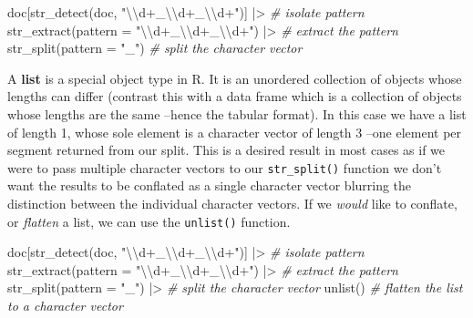 \documentclass[
  letterpaper,
  DIV=11,
  numbers=noendperiod]{scrreport}
\newenvironment{Shaded}{\begin{snugshade}}{\end{snugshade}}
\newcommand{\AttributeTok}[1]{\textcolor[rgb]{0.00,0.00,0.00}{#1}}
\newcommand{\CommentTok}[1]{\textcolor[rgb]{0.00,0.00,0.00}{\textit{#1}}}
\newcommand{\FunctionTok}[1]{\textcolor[rgb]{0.00,0.00,0.00}{#1}}
\newcommand{\NormalTok}[1]{\textcolor[rgb]{0.00,0.00,0.00}{#1}}
\newcommand{\SpecialCharTok}[1]{\textcolor[rgb]{0.00,0.00,0.00}{#1}}
\newcommand{\StringTok}[1]{\textcolor[rgb]{0.00,0.00,0.00}{#1}}
\theoremstyle{definition}
\theoremstyle{remark}
\begin{document}
\begin{Shaded}
\begin{Highlighting}[]
\NormalTok{doc[}\FunctionTok{str\_detect}\NormalTok{(doc, }\StringTok{"}\SpecialCharTok{\textbackslash{}\textbackslash{}}\StringTok{d+\_}\SpecialCharTok{\textbackslash{}\textbackslash{}}\StringTok{d+\_}\SpecialCharTok{\textbackslash{}\textbackslash{}}\StringTok{d+"}\NormalTok{)] }\SpecialCharTok{|\textgreater{}} \CommentTok{\# isolate pattern}
  \FunctionTok{str\_extract}\NormalTok{(}\AttributeTok{pattern =} \StringTok{"}\SpecialCharTok{\textbackslash{}\textbackslash{}}\StringTok{d+\_}\SpecialCharTok{\textbackslash{}\textbackslash{}}\StringTok{d+\_}\SpecialCharTok{\textbackslash{}\textbackslash{}}\StringTok{d+"}\NormalTok{) }\SpecialCharTok{|\textgreater{}} \CommentTok{\# extract the pattern}
  \FunctionTok{str\_split}\NormalTok{(}\AttributeTok{pattern =} \StringTok{"\_"}\NormalTok{) }\CommentTok{\# split the character vector}
\end{Highlighting}
\end{Shaded}

A \textbf{list} is a special object type in R. It is an unordered
collection of objects whose lengths can differ (contrast this with a
data frame which is a collection of objects whose lengths are the same
--hence the tabular format). In this case we have a list of length 1,
whose sole element is a character vector of length 3 --one element per
segment returned from our split. This is a desired result in most cases
as if we were to pass multiple character vectors to our
\texttt{str\_split()} function we don't want the results to be conflated
as a single character vector blurring the distinction between the
individual character vectors. If we \emph{would} like to conflate, or
\emph{flatten} a list, we can use the \texttt{unlist()} function.

\begin{Shaded}
\begin{Highlighting}[]
\NormalTok{doc[}\FunctionTok{str\_detect}\NormalTok{(doc, }\StringTok{"}\SpecialCharTok{\textbackslash{}\textbackslash{}}\StringTok{d+\_}\SpecialCharTok{\textbackslash{}\textbackslash{}}\StringTok{d+\_}\SpecialCharTok{\textbackslash{}\textbackslash{}}\StringTok{d+"}\NormalTok{)] }\SpecialCharTok{|\textgreater{}} \CommentTok{\# isolate pattern}
  \FunctionTok{str\_extract}\NormalTok{(}\AttributeTok{pattern =} \StringTok{"}\SpecialCharTok{\textbackslash{}\textbackslash{}}\StringTok{d+\_}\SpecialCharTok{\textbackslash{}\textbackslash{}}\StringTok{d+\_}\SpecialCharTok{\textbackslash{}\textbackslash{}}\StringTok{d+"}\NormalTok{) }\SpecialCharTok{|\textgreater{}} \CommentTok{\# extract the pattern}
  \FunctionTok{str\_split}\NormalTok{(}\AttributeTok{pattern =} \StringTok{"\_"}\NormalTok{) }\SpecialCharTok{|\textgreater{}} \CommentTok{\# split the character vector}
  \FunctionTok{unlist}\NormalTok{() }\CommentTok{\# flatten the list to a character vector}
\end{Highlighting}
\end{Shaded}
\end{document}
